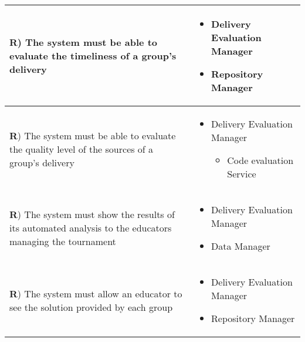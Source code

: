\documentclass[../DD.tex]{subfiles}
\newcounter{rown}
\newcommand{\rowIndex}{\arabic{rown}\stepcounter{rown}}
\begin{document}
\begin{table}[h!]
\begin{center}
\begin{tabular}{|m{20em}|m{20em}|}
            \hline
            \textbf{R\rowIndex}) The system must be able to evaluate the timeliness of a group's delivery & \begin{itemize}
                \item Delivery Evaluation Manager
                \item Repository Manager
            \end{itemize}\\
            \hline
            \textbf{R\rowIndex}) The system must be able to evaluate the quality level of the sources of a group's delivery & \begin{itemize}
                \item Delivery Evaluation Manager
                \begin{itemize}
                    \item Code evaluation Service
                \end{itemize}
            \end{itemize}\\
            \hline
            \textbf{R\rowIndex}) The system must show the results of its automated analysis to the educators managing the tournament & \begin{itemize}
                \item Delivery Evaluation Manager
                \item Data Manager
            \end{itemize}\\
            \hline
            \textbf{R\rowIndex}) The system must allow an educator to see the solution provided by each group & \begin{itemize}
                \item Delivery Evaluation Manager 
                \item Repository Manager
            \end{itemize}\\
            \hline
            \end{tabular}
        \end{center}
    \end{table}
    \newpage
\end{document}
